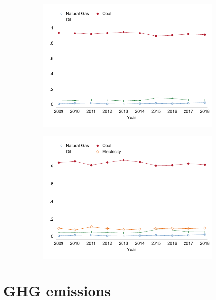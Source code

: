 \documentclass[12pt,notitlepage]{article}
\begin{document}
\begin{figure}[!htpb]
\centering
\caption{Quantity Shares (mmbtu)}
\begin{subfigure}{.49\textwidth}
    \centering
 \includegraphics[scale=0.8]{../Output/Graphs/FuelQuantityShare_year.pdf}
\end{subfigure}%
\begin{subfigure}{.49\textwidth}
    \centering
 \includegraphics[scale=0.8]{../Output/Graphs/EnergyQuantityShare_year.pdf}
\end{subfigure}
\end{figure}
\pagebreak

\section{GHG emissions}
\end{document}
